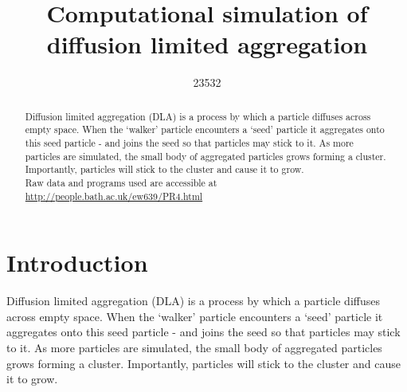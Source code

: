\documentclass[%
 reprint,
 amsmath,amssymb,
 aps,
]{revtex4-2}
\begin{document}

\title{Computational simulation of diffusion limited aggregation}%

\author{23532}

             
\begin{abstract}
Diffusion limited aggregation (DLA) is a process by which a particle diffuses across empty space. When the `walker' particle encounters a `seed' particle it aggregates onto this seed particle - and joins the seed so that particles may stick to it. As more particles are simulated, the small body of aggregated particles grows forming a cluster. Importantly, particles will stick to the cluster and cause it to grow.\\

Raw data and programs used are accessible at \href{http://people.bath.ac.uk/ew639/PR4.html}{http://people.bath.ac.uk/ew639/PR4.html}
\end{abstract}

\maketitle


\section{\label{sec:Introduction}Introduction}

Diffusion limited aggregation (DLA) is a process by which a particle diffuses across empty space. When the `walker' particle encounters a `seed' particle it aggregates onto this seed particle - and joins the seed so that particles may stick to it. As more particles are simulated, the small body of aggregated particles grows forming a cluster. Importantly, particles will stick to the cluster and cause it to grow.
\end{document}
